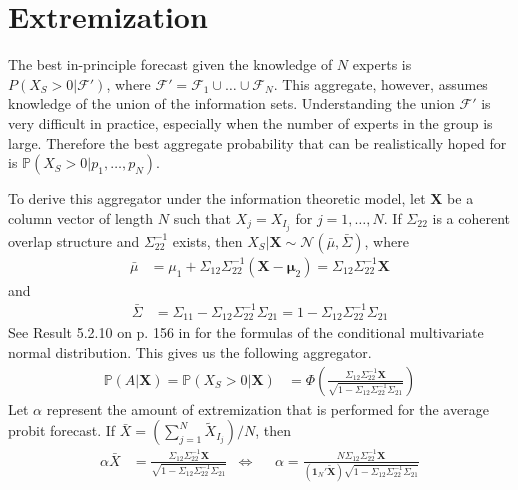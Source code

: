 \documentclass[11pt,twoside]{article}
\renewcommand{\P}{\mathbb{P}}
\begin{document}
\section{Extremization}
\label{extremization}

The best in-principle forecast given the knowledge of $N$ experts is $P(X_{S} > 0 |  \mathcal{F}')$, where $\mathcal{F}' = \mathcal{F}_1 \cup \dots \cup \mathcal{F}_N$. This aggregate, however, assumes knowledge of the union of the information sets. Understanding the union $\mathcal{F}'$ is very difficult in practice, especially when the number of experts in the group is large. Therefore the best aggregate probability that can be realistically hoped for is  $\P(X_{S} > 0 | p_1, \dots, p_N)$.

To derive this aggregator under the information theoretic model, let $\boldsymbol{X}$ be a column vector of length $N$ such that $X_j = X_{I_j}$ for $j = 1, \dots, N$. If $\Sigma_{22}$ is a coherent overlap structure and $\Sigma_{22}^{-1}$ exists, then $X_{S} | \boldsymbol{X} \sim \mathcal{N}(\bar{\mu}, \bar{\Sigma})$, where
\begin{align}
\bar{\mu} &= \mu_1 + \Sigma_{12} \Sigma_{22}^{-1} (\boldsymbol{X} - \boldsymbol{\mu}_2) =  \Sigma_{12} \Sigma_{22}^{-1} \boldsymbol{X} \label{condMu}
\end{align}
and
\begin{align}
 \bar{\Sigma}&= \Sigma_{11} - \Sigma_{12} \Sigma_{22}^{-1} \Sigma_{21} =1 - \Sigma_{12} \Sigma_{22}^{-1} \Sigma_{21}  \label{condSigma}
\end{align}
See Result 5.2.10 on p. 156 in \cite{ravishanker2001first} for the formulas of the conditional multivariate normal distribution. This gives us the following aggregator. 
\begin{align}
\P\left(A  | \boldsymbol{X}\right)  = \P\left(X_{S} > 0 | \boldsymbol{X}\right) &= \Phi\left( \frac{\Sigma_{12} \Sigma_{22}^{-1} \boldsymbol{X}}{\sqrt{1 - \Sigma_{12} \Sigma_{22}^{-1} \Sigma_{21}}}\right) \label{GeneralAggregator}
\end{align}
Let $\alpha$ represent the amount of extremization that is performed for the average probit forecast. If $\bar{X} = \left( \sum_{j=1}^N \tilde{X}_{I_j} \right)/N$, then
\begin{align}
\alpha \bar{X}&=  \frac{\Sigma_{12} \Sigma_{22}^{-1} \boldsymbol{X}}{\sqrt{1 - \Sigma_{12} \Sigma_{22}^{-1} \Sigma_{21}}}  &\Leftrightarrow&& \alpha  = \frac{N \Sigma_{12} \Sigma_{22}^{-1} \boldsymbol{X}}{\left(\boldsymbol{1}_N' \boldsymbol{\tilde{X}} \right) \sqrt{1 - \Sigma_{12} \Sigma_{22}^{-1} \Sigma_{21}}} \label{alpha}
\end{align}
\end{document}
